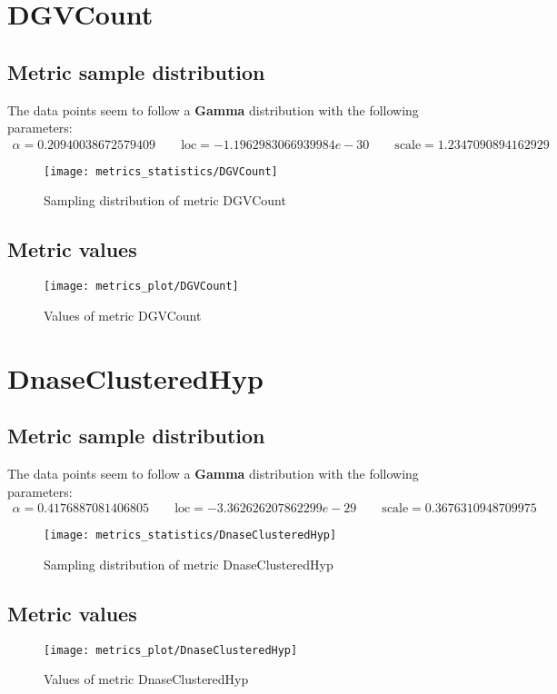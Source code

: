 \clearpage
\section{DGVCount}
\subsection{Metric sample distribution}
The data points seem to follow a \textbf{Gamma} distribution with the following parameters:
\begin{align*}
	\alpha   = 0.20940038672579409    \qquad  \text{loc} = -1.1962983066939984e-30 \qquad \text{scale} = 1.2347090894162929
\end{align*}
\begin{figure}
	\texttt{[image: metrics\_statistics/DGVCount]}
	\caption{Sampling distribution of metric DGVCount}
\end{figure}
\subsection{Metric values}
\begin{figure}
	\texttt{[image: metrics\_plot/DGVCount]}
	\caption{Values of metric DGVCount}
\end{figure}

\clearpage
\section{DnaseClusteredHyp}
\subsection{Metric sample distribution}
The data points seem to follow a \textbf{Gamma} distribution with the following parameters:
\begin{align*}
	\alpha   = 0.4176887081406805    \qquad  \text{loc} = -3.362626207862299e-29 \qquad \text{scale} = 0.3676310948709975
\end{align*}
\begin{figure}
	\texttt{[image: metrics\_statistics/DnaseClusteredHyp]}
	\caption{Sampling distribution of metric DnaseClusteredHyp}
\end{figure}
\subsection{Metric values}
\begin{figure}
	\texttt{[image: metrics\_plot/DnaseClusteredHyp]}
	\caption{Values of metric DnaseClusteredHyp}
\end{figure}

